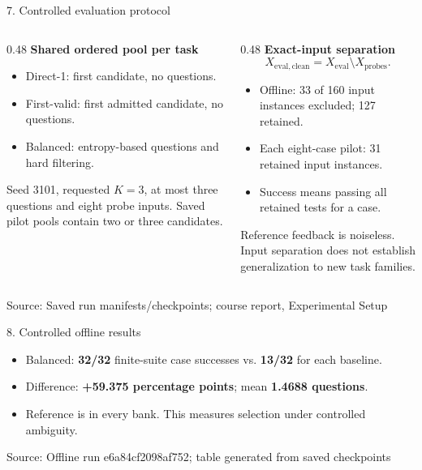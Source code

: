 \documentclass[aspectratio=169,10pt]{beamer}
\newcommand{\source}[1]{\par\vfill{\scriptsize\color{gray}Source: #1\par}}
\begin{document}
\begin{frame}{7. Controlled evaluation protocol}
  \begin{columns}[T]
    \begin{column}{0.48\textwidth}
      \textbf{Shared ordered pool per task}
      \begin{itemize}
        \item Direct-1: first candidate, no questions.
        \item First-valid: first admitted candidate, no questions.
        \item Balanced: entropy-based questions and hard filtering.
      \end{itemize}
      \par\medskip
      Seed 3101, requested $K=3$, at most three questions and eight probe inputs. Saved pilot pools contain two or three candidates.
    \end{column}
    \begin{column}{0.48\textwidth}
      \textbf{Exact-input separation}
      \[
        X_{\mathrm{eval,clean}}=X_{\mathrm{eval}}\setminus X_{\mathrm{probes}}.
      \]
      \begin{itemize}
        \item Offline: 33 of 160 input instances excluded; 127 retained.
        \item Each eight-case pilot: 31 retained input instances.
        \item Success means passing all retained tests for a case.
      \end{itemize}
      \par\medskip
      Reference feedback is noiseless. Input separation does not establish generalization to new task families.
    \end{column}
  \end{columns}
  \source{Saved run manifests/checkpoints; course report, Experimental Setup}
\end{frame}

\begin{frame}{8. Controlled offline results}
  \centering
  
  \par\medskip
  \raggedright
  \begin{itemize}
    \item Balanced: \textbf{32/32} finite-suite case successes vs. \textbf{13/32} for each baseline.
    \item Difference: \textbf{+59.375 percentage points}; mean \textbf{1.4688 questions}.
    \item Reference is in every bank. This measures selection under controlled ambiguity.
  \end{itemize}
  \source{Offline run e6a84cf2098af752; table generated from saved checkpoints}
\end{frame}
\end{document}
